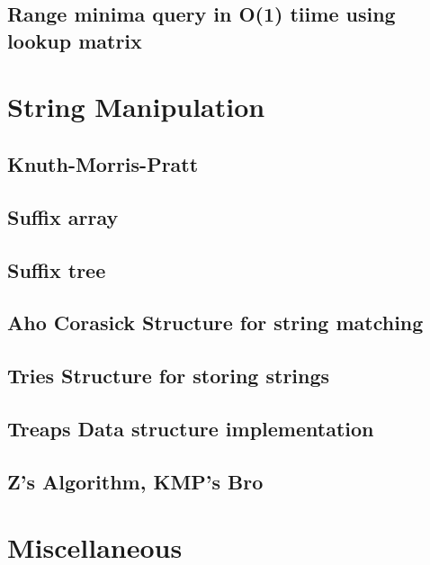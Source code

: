 \subsection{Range minima query in O(1) tiime using lookup matrix}
\raggedbottom
\hrulefill

\section{String Manipulation}
\subsection{Knuth-Morris-Pratt}
\raggedbottom
\hrulefill
\subsection{Suffix array}
\raggedbottom
\hrulefill
\subsection{Suffix tree}
\raggedbottom
\hrulefill
\subsection{Aho Corasick Structure for string matching}
\raggedbottom
\hrulefill
\subsection{Tries Structure for storing strings}
\raggedbottom
\hrulefill
\subsection{Treaps Data structure implementation}
\raggedbottom
\hrulefill
\subsection{Z's Algorithm, KMP's Bro}
\raggedbottom
\hrulefill

\section{Miscellaneous}
